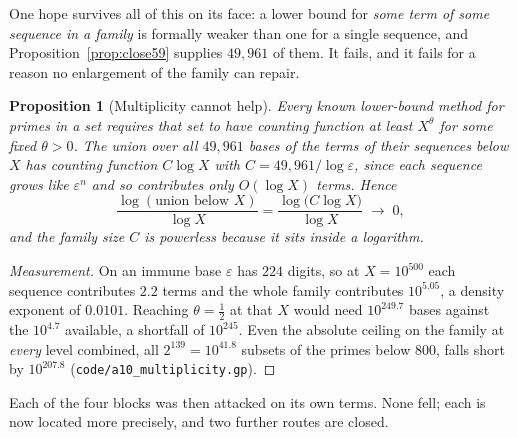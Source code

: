 \documentclass[11pt]{article}
\newtheorem{proposition}[theorem]{Proposition}
\theoremstyle{definition}
\begin{document}
One hope survives all of this on its face: a lower bound for \emph{some term of some sequence in a
family} is formally weaker than one for a single sequence, and Proposition~\ref{prop:close59}
supplies $49{,}961$ of them. It fails, and it fails for a reason no enlargement of the family can
repair.

\begin{proposition}[Multiplicity cannot help]\label{prop:multiplicityfail}
Every known lower-bound method for primes in a set requires that set to have counting function at
least $X^{\theta}$ for some fixed $\theta>0$. The union over all $49{,}961$ bases of the terms of
their sequences below $X$ has counting function $C\log X$ with $C=49{,}961/\log\varepsilon$, since
each sequence grows like $\varepsilon^n$ and so contributes only $O(\log X)$ terms. Hence
\[ \frac{\log(\text{union below }X)}{\log X}=\frac{\log\bigl(C\log X\bigr)}{\log X}\;\longrightarrow\;0, \]
and the family size $C$ is powerless because it sits inside a logarithm.
\end{proposition}
\begin{proof}[Measurement]
On an immune base $\varepsilon$ has $224$ digits, so at $X=10^{500}$ each sequence contributes
$2.2$ terms and the whole family contributes $10^{5.05}$, a density exponent of $0.0101$. Reaching
$\theta=\tfrac12$ at that $X$ would need $10^{249.7}$ bases against the $10^{4.7}$ available, a
shortfall of $10^{245}$. Even the absolute ceiling on the family at \emph{every} level combined,
all $2^{139}=10^{41.8}$ subsets of the primes below $800$, falls short by $10^{207.8}$
\textup{(\texttt{code/a10\_multiplicity.gp})}.
\end{proof}

Each of the four blocks was then attacked on its own terms. None fell; each is now located more
precisely, and two further routes are closed.
\end{document}
